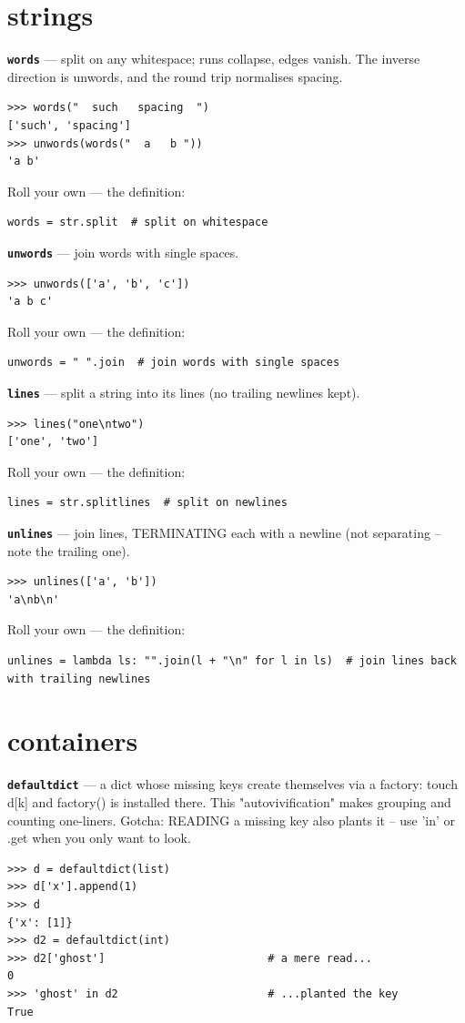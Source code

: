 \documentclass[10pt,letterpaper]{article}
\begin{document}
\section{strings}
\textbf{\texttt{words}} --- split on any whitespace; runs collapse, edges vanish. The inverse direction is unwords, and the round trip normalises spacing.
\begin{lstlisting}[style=ex]
>>> words("  such   spacing  ")
['such', 'spacing']
>>> unwords(words("  a   b "))
'a b'
\end{lstlisting}

Roll your own --- the definition:

\begin{lstlisting}[style=ex]
words = str.split  # split on whitespace
\end{lstlisting}
\textbf{\texttt{unwords}} --- join words with single spaces.
\begin{lstlisting}[style=ex]
>>> unwords(['a', 'b', 'c'])
'a b c'
\end{lstlisting}

Roll your own --- the definition:

\begin{lstlisting}[style=ex]
unwords = " ".join  # join words with single spaces
\end{lstlisting}
\textbf{\texttt{lines}} --- split a string into its lines (no trailing newlines kept).
\begin{lstlisting}[style=ex]
>>> lines("one\ntwo")
['one', 'two']
\end{lstlisting}

Roll your own --- the definition:

\begin{lstlisting}[style=ex]
lines = str.splitlines  # split on newlines
\end{lstlisting}
\textbf{\texttt{unlines}} --- join lines, TERMINATING each with a newline (not separating -- note the trailing one).
\begin{lstlisting}[style=ex]
>>> unlines(['a', 'b'])
'a\nb\n'
\end{lstlisting}

Roll your own --- the definition:

\begin{lstlisting}[style=ex]
unlines = lambda ls: "".join(l + "\n" for l in ls)  # join lines back with trailing newlines
\end{lstlisting}

\section{containers}
\textbf{\texttt{defaultdict}} --- a dict whose missing keys create themselves via a factory: touch d[k] and factory() is installed there. This "autovivification" makes grouping and counting one-liners. Gotcha: READING a missing key also plants it -- use 'in' or .get when you only want to look.
\begin{lstlisting}[style=ex]
>>> d = defaultdict(list)
>>> d['x'].append(1)
>>> d
{'x': [1]}
>>> d2 = defaultdict(int)
>>> d2['ghost']                         # a mere read...
0
>>> 'ghost' in d2                       # ...planted the key
True
\end{lstlisting}
\end{document}

